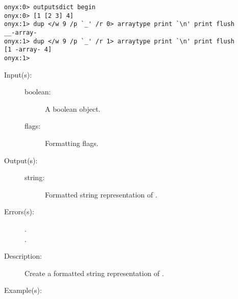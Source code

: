\begin{description}
\begin{description}
\begin{verbatim}
onyx:0> outputsdict begin
onyx:0> [1 [2 3] 4]
onyx:1> dup </w 9 /p `_' /r 0> arraytype print `\n' print flush
__-array-
onyx:1> dup </w 9 /p `_' /r 1> arraytype print `\n' print flush
[1 -array- 4]
onyx:1>
		\end{verbatim}
	\end{description}
\label{outputsdict:booleantype}
\item[{\onyxop{boolean flags}{booleantype}{string}}: ]
	\begin{description}\item[]
	\item[Input(s): ]
		\begin{description}\item[]
		\item[boolean: ]
			A boolean object.
		\item[flags: ]
			Formatting flags.
		\end{description}
	\item[Output(s): ]
		\begin{description}\item[]
		\item[string: ]
			Formatted string representation of .
		\end{description}
	\item[Errors(s): ]
		\begin{description}\item[]
		\item[.]
		\item[.]
		\end{description}
	\item[Description: ]
		Create a formatted string representation of .
	\item[Example(s): ]\begin{verbatim}


\end{verbatim}
\end{description}
\end{description}
